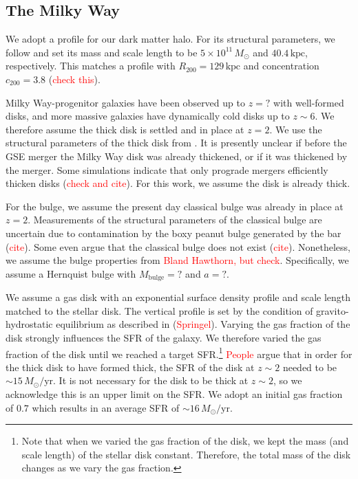 \documentclass[linenumbers, twocolumn]{aastex631}
\newcommand{\Msun}{\ensuremath{M_{\odot}}}
\newcommand{\yr}{\ensuremath{\textrm{yr}}}
\newcommand{\kpc}{\ensuremath{\textrm{kpc}}}
\begin{document}
\subsection{The Milky Way}
We adopt a \citet{1990ApJ...356..359H} profile for our dark matter halo. For its
structural parameters, we follow \citet{2021ApJ...923...92N} and set its mass
and scale length to be $5\times10^{11}\,\Msun$ and $40.4\,\kpc$, respectively.
This matches a \citet{1996ApJ...462..563N} profile with
$R_{200}=129\,\textrm{kpc}$ and concentration $c_{200}=3.8$
(\textcolor{red}{check this}).

Milky Way-progenitor galaxies have been observed up to $z=?$ with well-formed
disks, and more massive galaxies have dynamically cold disks up to $z\sim6$. We
therefore assume the thick disk is settled and in place at $z=2$. We use the
structural parameters of the thick disk from . It is presently unclear if before
the GSE merger the Milky Way disk was already thickened, or if it was thickened
by the merger. Some simulations indicate that only prograde mergers efficiently
thicken disks (\textcolor{red}{check and cite}). For this work, we assume the
disk is already thick.

For the bulge, we assume the present day classical bulge was already in place at
$z=2$. Measurements of the structural parameters of the classical bulge are
uncertain due to contamination by the boxy peanut bulge generated by the bar
(\textcolor{red}{cite}). Some even argue that the classical bulge does not exist
(\textcolor{red}{cite}). Nonetheless, we assume the bulge properties from
\textcolor{red}{Bland Hawthorn, but check}. Specifically, we assume a Hernquist
bulge with $M_{\textrm{bulge}}=?$ and $a=?$.

We assume a gas disk with an exponential surface density profile and scale
length matched to the stellar disk. The vertical profile is set by the condition
of gravito-hydrostatic equilibrium as described in (\textcolor{red}{Springel}).
Varying the gas fraction of the disk strongly influences the SFR of the galaxy.
We therefore varied the gas fraction of the disk until we reached a target
SFR.\footnote{Note that when we varied the gas fraction of the disk, we kept the
mass (and scale length) of the stellar disk constant. Therefore, the total mass
of the disk changes as we vary the gas fraction.} \textcolor{red}{People} argue
that in order for the thick disk to have formed thick, the SFR of the disk at
$z\sim2$ needed to be $\sim15\,\Msun/\yr$. It is not necessary for the disk to
be thick at $z\sim2$, so we acknowledge this is an upper limit on the SFR. We
adopt an initial gas fraction of $0.7$ which results in an average SFR of
$\sim16\,\Msun/\yr$.
\end{document}
